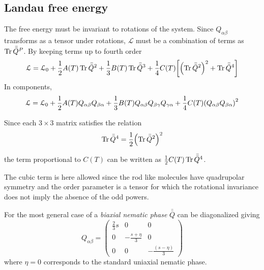 \documentclass[../main/main.tex]{subfiles}
\begin{document}
\subsection{Landau free energy}
The free energy must be invariant to rotations of the system. Since \( Q_{\alpha \beta } \) transforms as a tensor under rotations, \( \mathcal{L} \) must be a combination of terms as \( \Tr \bar{\bar{Q} }^P \). By keeping terms up to fourth order
\begin{equation}
  \mathcal{L} = \mathcal{L}_0 + \frac{1}{2} A(T) \Tr \bar{\bar{Q} }^2 + \frac{1}{3} B(T) \Tr \bar{\bar{Q} }^3 + \frac{1}{4} C(T) \qty[ \qty(\Tr \bar{\bar{Q} }^2  )^2 + \Tr \bar{\bar{Q} }^4 ]
\end{equation}
In components,
\begin{equation}
  \mathcal{L} = \mathcal{L}_0 + \frac{1}{2} A(T) Q_{\alpha \beta }Q_{\beta \alpha } + \frac{1}{3} B(T) Q_{\alpha \beta } Q_{\beta \gamma  } Q_{\gamma  \alpha }+ \frac{1}{4} C(T) \qty(Q_{\alpha \beta } Q_{\beta  \alpha })^2
\end{equation}
\begin{remark}
Since each \( 3 \times 3 \) matrix satisfies the relation
\begin{equation}
   \Tr \bar{\bar{Q} }^4 = \frac{1}{2} \qty( \Tr \bar{\bar{Q} }^2)^2
\end{equation}
\end{remark}
the term proportional to \( C(T) \) can be written as \( \frac{1}{2}C(T)  \Tr \bar{\bar{Q} }^4 \).
\begin{remark}
The cubic term is here allowed since the rod like molecules have quadrupolar symmetry and the order parameter is a tensor for which the rotational invariance does not imply the absence of the odd powers.
\end{remark}
For the most general case of a \emph{biaxial nematic phase} \( \bar{\bar{Q} }  \) can be diagonalized giving
\begin{equation}
  Q_{\alpha \beta } =
  \begin{pmatrix}
  \frac{2}{3}s   & 0  & 0 \\
    0 &  - \frac{s+ \eta  }{3} & 0 \\
    0 &  0 & - \frac{(s- \eta  )}{3}
  \end{pmatrix}
\end{equation}
where \( \eta =0 \) corresponds to the standard uniaxial nematic phase.
\end{document}
